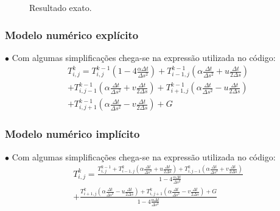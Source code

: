\documentclass[xcolor=dvipsnames,10pt,aspectratio=169]{beamer}
\begin{document}
\begin{frame}
\begin{minipage}[h!]{0.17\textwidth}
\begin{figure}[h!]
	\caption{ Resultado exato.}
\end{figure}
\end{minipage}
\end{frame}	





\begin{frame} 
\frametitle{Modelo numérico explícito}
$\bullet$ Com algumas simplificações chega-se na expressão utilizada no código:
\begin{equation}
\begin{split}
T_{i,j}^{k} = T_{i,j}^{k-1} \left( 1 - 4 \frac{\alpha \Delta t}{\Delta s ^2}\right) + T_{i -1, j}^{k-1} \left( \alpha \frac{\Delta t}{\Delta s^2} + u \frac{\Delta t}{2 \Delta s} \right)\\
+ T_{i,j-1}^{k-1} \left( \alpha \frac{\Delta t}{\Delta s^2} + v \frac{\Delta t}{2 \Delta s} \right) +  T_{i+1,j}^{k-1} \left( \alpha \frac{\Delta t}{ \Delta s^2} - u \frac{\Delta t}{2 \Delta s}\right) \\
+  T_{i,j+1}^{k-1} \left( \alpha \frac{\Delta t}{\Delta s^2} - v \frac{\Delta t}{2 \Delta s}\right) + G
\end{split}
\end{equation}

\end{frame}




\begin{frame} 
\frametitle{Modelo numérico implícito}
$\bullet$ Com algumas simplificações chega-se na expressão utilizada no código:
\begin{equation}
\begin{split}
T_{i,j}^{k} = \frac{T_{i,j}^{k-1} + T_{i -1, j}^{k} \left( \alpha \frac{\Delta t}{\Delta s^2} + u \frac{\Delta t}{2 \Delta s} \right) 	+ T_{i,j-1}^{k} \left( \alpha \frac{\Delta t}{\Delta s^2} + v \frac{\Delta t}{2 \Delta s} \right)}{ 1 - 4 \frac{\alpha \Delta t}{\Delta s ^2}} \\
+ \frac{  T_{i+1,j}^{k} \left( \alpha \frac{\Delta t}{ \Delta s^2} - u \frac{\Delta t}{2 \Delta s}\right) 
	+  T_{i,j+1}^{k} \left( \alpha \frac{\Delta t}{\Delta s^2} - v \frac{\Delta t}{2 \Delta s}\right) + G}{ 1 - 4 \frac{\alpha \Delta t}{\Delta s ^2}}
\end{split}
\end{equation}

\end{frame}
\end{document}

